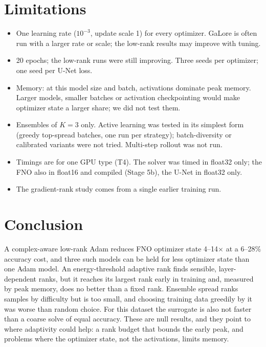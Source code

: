 \documentclass[11pt,a4paper]{article}
\begin{document}
\section{Limitations}
\begin{itemize}\itemsep1pt
\item One learning rate ($10^{-3}$, update scale 1) for every optimizer. GaLore is often run with a larger rate or
scale; the low-rank results may improve with tuning.
\item 20 epochs; the low-rank runs were still improving. Three seeds per optimizer; one seed per U-Net loss.
\item Memory: at this model size and batch, activations dominate peak memory. Larger models, smaller batches or
activation checkpointing would make optimizer state a larger share; we did not test them.
\item Ensembles of $K=3$ only. Active learning was tested in its simplest form (greedy top-spread batches, one run
per strategy); batch-diversity or calibrated variants were not tried. Multi-step rollout was not run.
\item Timings are for one GPU type (T4). The solver was timed in float32 only; the FNO also in float16 and compiled
(Stage 5b), the U-Net in float32 only.
\item The gradient-rank study comes from a single earlier training run.
\end{itemize}

\section{Conclusion}
A complex-aware low-rank Adam reduces FNO optimizer state 4--14$\times$ at a 6--28\% accuracy cost, and three such
models can be held for less optimizer state than one Adam model. An energy-threshold adaptive rank finds sensible,
layer-dependent ranks, but it reaches its largest rank early in training and, measured by peak memory, does no
better than a fixed rank. Ensemble spread ranks samples by difficulty but is too small, and choosing training data greedily by it was worse
than random choice. For this dataset the surrogate is also not faster than a coarse solve of equal accuracy.
These are null results, and they point to where adaptivity could help: a rank budget that bounds the early peak,
and problems where the optimizer state, not the activations, limits memory.
\end{document}
